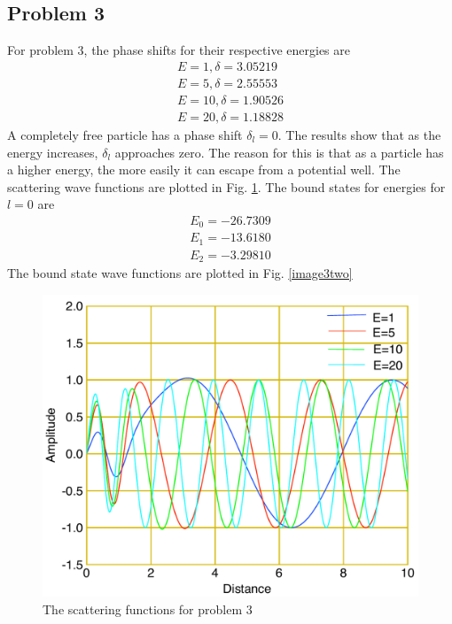\documentclass[12pt]{article}
\begin{document}
\subsection{Problem 3}
For problem 3, the phase shifts for their respective energies are
\begin{align*}
E = 1,\delta=3.05219  \\ 
E= 5 ,\delta=2.55553 \\
E= 10,\delta=1.90526 \\ 
E =20,\delta=1.18828
\end{align*}
A completely free particle has a phase shift $\delta_l=0$. The results show that as the energy increases, $\delta_l$ approaches zero. The reason for this is that as a particle has a higher energy, the more easily it can escape from a potential well. The scattering wave functions are plotted in Fig. \ref {image3one}. The bound states for energies for $l=0$ are
\begin{align*}
E_0 = -26.7309  \\ 
E_1 = -13.6180   \\
E_2 = -3.29810
\end{align*}
The bound state wave functions are plotted in Fig. \ref {image3two}
\begin {figure}[!htb]
	\includegraphics[width=1.\textwidth]{question_3/plot1new.pdf}
	\caption{The scattering functions for problem 3 }
	\label{image3one}
\end {figure}
\end{document}
